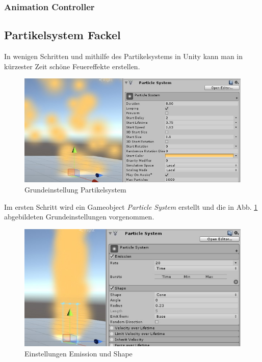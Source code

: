 \subsubsection{Animation Controller}


\subsection{Partikelsystem Fackel}
In wenigen Schritten und mithilfe des Partikelsystems in Unity kann man in kürzester Zeit schöne Feuereffekte erstellen.

\begin{figure}[h!]
\centering
\includegraphics[width=0.95\linewidth]{Abbildungen/Unity/Fire/fire1}
\caption{Grundeinstellung Partikelsystem}
\label{fig:fire1}
\end{figure}

Im ersten Schritt wird ein Gameobject \textit{Particle System} erstellt und die in Abb. \ref{fig:fire1} abgebildeten Grundeinstellungen vorgenommen.

\begin{figure}[h!]
\centering
\includegraphics[width=0.95\linewidth]{Abbildungen/Unity/Fire/fire2}
\caption{Einstellungen Emission und Shape}
\label{fig:fire2}
\end{figure}


